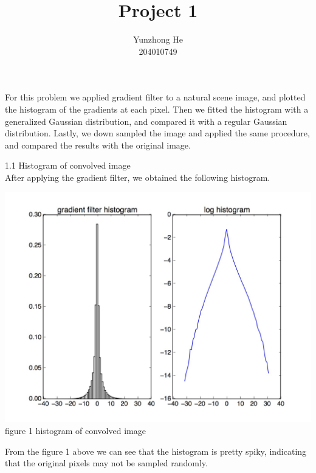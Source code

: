 \documentclass[12pt]{article}
\newenvironment{problem}[2][Problem]{\begin{trivlist}
\item[\hskip \labelsep {\bfseries #1}\hskip \labelsep {\bfseries #2}]}{\end{trivlist}}
\begin{document}
 
 
\title{Project 1}%
\author{Yunzhong He\\ %
204010749} %
 
\maketitle

\begin{problem}{1. High Kurtosis and Scale Invariance}
\item{}
For this problem we applied gradient filter to a natural scene image, and plotted the histogram of the gradients at each pixel. Then we fitted the histogram with a generalized Gaussian distribution, and compared it with a regular Gaussian distribution. Lastly, we down sampled the image and applied the same procedure, and compared the results with the original image.\\
\item{1.1 Histogram of convolved image\\}
After applying the gradient filter, we obtained the following histogram.
\begin{center}
		\includegraphics[height=10cm]{results/q1_1.jpg}{\\figure 1 histogram of convolved image}
\end{center}
From the figure 1 above we can see that the histogram is pretty spiky, indicating that the original pixels may not be sampled randomly.\\

\end{problem}
\end{document}
